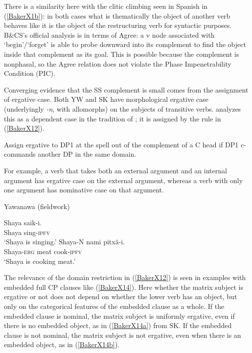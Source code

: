 \documentclass[output=paper]{langscibook}
\begin{document}
There is a similarity here with the clitic climbing seen in Spanish in (\ref{BakerX1b}): in both cases what is thematically the object of another verb behaves like it is the object of the restructuring verb for syntactic purposes. B\&CS’s official analysis is in terms of Agree: a v node associated with ‘begin’/‘forget’ is able to probe downward into its complement to find the object inside that complement as its goal. This is possible because the complement is nonphasal, so the Agree relation does not violate the Phase Impenetrability Condition (PIC).

Converging evidence that the SS complement is small comes from the assignment of ergative case. Both YW and SK have morphological ergative case (underlyingly \textit{-n}, with allomorphs) on the subjects of transitive verbs. \citet{baker2014dependent, baker2015case} analyzes this as a dependent case in the tradition of \citet{Marantz1991}; it is assigned by the rule in (\ref{BakerX12}).

\begin{exe}
    \ex \label{BakerX12} Assign ergative to DP1 at the spell out of the complement of a C head if DP1 c-commands another DP in the same domain.
\end{exe}

For example, a verb that takes both an external argument and an internal argument has ergative case on the external argument, whereas a verb with only one argument has nominative case on that argument.

\begin{exe}
\ex Yawanawa (fieldwork) \label{BakerX13}
    \begin{xlist}
    \ex \label{BakerX13a}
		\gll Shaya saik-i.\\
			 Shaya sing-\textsc{ipfv}\\
		    \glt `Shaya is singing.'
	\ex \label{BakerX13b}
		\gll Shaya-N nami pitxã-i.\\
			 Shaya-\textsc{erg} meat cook-\textsc{ipfv}\\
		    \glt `Shaya is cooking meat.'
    \end{xlist}
\end{exe}

The relevance of the domain restriction in (\ref{BakerX12}) is seen in examples with embedded full CP clauses like (\ref{BakerX14}). Here whether the matrix subject is ergative or not does not depend on whether the lower verb has an object, but only on the categorical features of the embedded clause as a whole. If the embedded clause is nominal, the matrix subject is uniformly ergative, even if there is no embedded object, as in (\ref{BakerX14a}) from SK. If the embedded clause is not nominal, the matrix subject is not ergative, even when there is an embedded object, as in (\ref{BakerX14b}).
\end{document}
